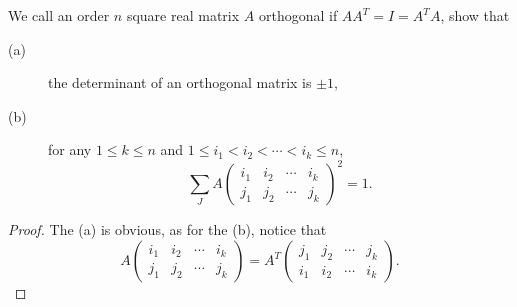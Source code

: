 \begin{pro}%
	We call an order $n$ square real matrix $A$ orthogonal if $AA^T=I=A^TA$, show that
	\begin{description}
	\item[(a)] the determinant of an orthogonal matrix is $\pm 1$,
	\item[(b)] for any $1\leq k\leq n$ and $1\leq i_1<i_2<\cdots<i_k\leq n$,
	\[\sum_{J} A\begin{pmatrix}i_1&i_2&\cdots&i_k\\j_1&j_2&\cdots&j_k\end{pmatrix}^2=1.\]
	\end{description}
\end{pro}
\begin{proof}
	The (a) is obvious, as for the (b), notice that 
	\[A\begin{pmatrix}i_1&i_2&\cdots&i_k\\j_1&j_2&\cdots&j_k\end{pmatrix}=
	A^T\begin{pmatrix}j_1&j_2&\cdots&j_k\\i_1&i_2&\cdots&i_k\end{pmatrix}.\]
\end{proof}

